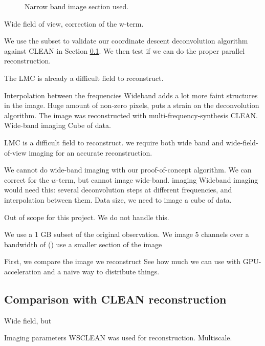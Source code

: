 \begin{figure}[h]
\begin{subfigure}[b]{0.30\linewidth}
	\end{subfigure}
	\caption{Narrow band image section used.}
	\label{results:cutout}
\end{figure}

Wide field of view, correction of the w-term.

We use the subset to validate our coordinate descent deconvolution algorithm against CLEAN in Section \ref{results:cleancomp}.
We then test if we can do the proper parallel reconstruction.



The LMC is already a difficult field to reconstruct.


Interpolation between the frequencies
Wideband adds a lot more faint structures in the image.
Huge amount of non-zero pixels, puts a strain on the deconvolution algorithm.
The image was reconstructed with multi-frequency-synthesis CLEAN.
Wide-band imaging Cube of data. 

LMC is a difficult field to reconstruct. we require both wide band and wide-field-of-view imaging for an accurate reconstruction. 









We cannot do wide-band imaging with our proof-of-concept algorithm. We can correct for the $w$-term, but cannot image wide-band. imaging
Wideband imaging would need this: several deconvolution steps at different frequencies, and interpolation between them.
Data size, we need to image a cube of data.

Out of scope for this project. We do not handle this.


We use a 1 GB subset of the original observation. We image 5 channels over a bandwidth of ()
use a smaller section of the image

First, we compare the image we reconstruct
See how much we can use with GPU-acceleration and a naive way to distribute things.


\subsection{Comparison with CLEAN reconstruction} \label{results:cleancomp}

Wide field, but

Imaging parameters
WSCLEAN was used for reconstruction. Multiscale.




